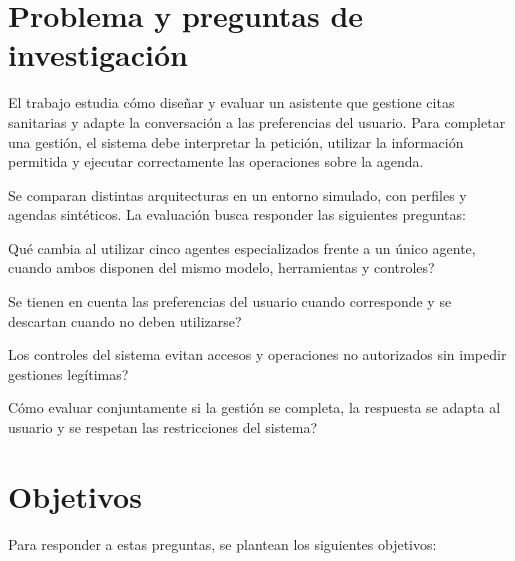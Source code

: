 \section{Problema y preguntas de investigación}

El trabajo estudia cómo diseñar y evaluar un asistente que gestione citas
sanitarias y adapte la conversación a las preferencias del usuario. Para
completar una gestión, el sistema debe interpretar la petición, utilizar la
información permitida y ejecutar correctamente las operaciones sobre la agenda.

Se comparan distintas arquitecturas en un entorno simulado, con perfiles y
agendas sintéticos. La evaluación busca responder las siguientes preguntas:

\begin{description}[style=nextline]
  \item[PI1.] \textquestiondown{}Qué cambia al utilizar cinco agentes especializados frente a un
  único agente, cuando ambos disponen del mismo modelo, herramientas y controles?
  \item[PI2.] \textquestiondown{}Se tienen en cuenta las preferencias del usuario cuando
  corresponde y se descartan cuando no deben utilizarse?
  \item[PI3.] \textquestiondown{}Los controles del sistema evitan accesos y operaciones no
  autorizados sin impedir gestiones legítimas?
  \item[PI4.] \textquestiondown{}Cómo evaluar conjuntamente si la gestión se completa, la
  respuesta se adapta al usuario y se respetan las restricciones del sistema?
\end{description}

\section{Objetivos}

Para responder a estas preguntas, se plantean los siguientes objetivos:

